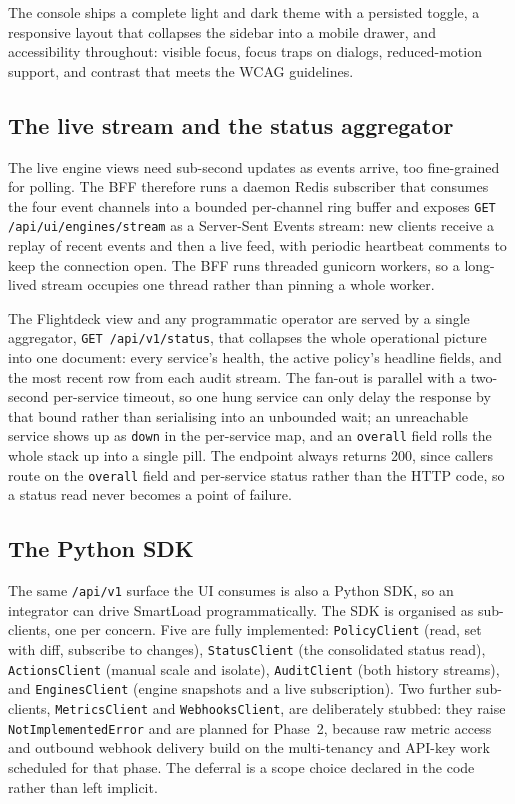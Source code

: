 The console ships a complete light and dark theme with a persisted toggle, a
responsive layout that collapses the sidebar into a mobile drawer, and accessibility
throughout: visible focus, focus traps on dialogs, reduced-motion support, and
contrast that meets the WCAG guidelines.

\subsection{The live stream and the status aggregator}
\label{sec:ima:sse}

The live engine views need sub-second updates as events arrive, too fine-grained for
polling. The BFF therefore runs a daemon Redis subscriber that consumes the four
event channels into a bounded per-channel ring buffer and exposes \texttt{GET
/api/ui/engines/stream} as a Server-Sent Events stream: new clients receive a replay
of recent events and then a live feed, with periodic heartbeat comments to keep the
connection open. The BFF runs threaded gunicorn workers, so a long-lived stream
occupies one thread rather than pinning a whole worker.

The Flightdeck view and any programmatic operator are served by a single aggregator,
\texttt{GET /api/v1/status}, that collapses the whole operational picture into one
document: every service's health, the active policy's headline fields, and the most
recent row from each audit stream. The fan-out is parallel with a two-second
per-service timeout, so one hung service can only delay the response by that bound
rather than serialising into an unbounded wait; an unreachable service shows up as
\texttt{down} in the per-service map, and an \texttt{overall} field rolls the whole
stack up into a single pill. The endpoint always returns 200, since callers route on
the \texttt{overall} field and per-service status rather than the HTTP code, so a
status read never becomes a point of failure.

\subsection{The Python SDK}
\label{sec:ima:sdk}

The same \texttt{/api/v1} surface the UI consumes is also a Python SDK, so an
integrator can drive SmartLoad programmatically. The SDK is organised as
sub-clients, one per concern. Five are fully implemented: \texttt{PolicyClient}
(read, set with diff, subscribe to changes), \texttt{StatusClient} (the consolidated
status read), \texttt{ActionsClient} (manual scale and isolate),
\texttt{AuditClient} (both history streams), and \texttt{EnginesClient} (engine
snapshots and a live subscription). Two further sub-clients, \texttt{MetricsClient}
and \texttt{WebhooksClient}, are deliberately stubbed: they raise
\texttt{NotImplementedError} and are planned for Phase~2, because raw metric access
and outbound webhook delivery build on the multi-tenancy and API-key work scheduled
for that phase. The deferral is a scope choice declared in the code rather than left
implicit.


